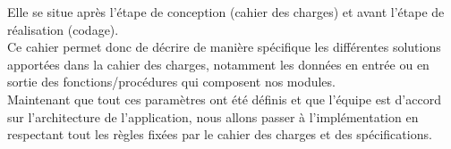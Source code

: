 \documentclass[a4]{article}
\begin{document}
	Elle se situe après l'étape de conception (cahier des charges) et avant l'étape de réalisation (codage).\\
	
	Ce cahier permet donc de décrire de manière spécifique les différentes solutions apportées dans la cahier des charges, notamment les données en entrée
	ou en sortie des fonctions/procédures qui composent nos modules.\\
	
	
	
	Maintenant que tout ces paramètres ont été définis et que l'équipe est d'accord sur l'architecture de l'application, nous allons
	passer à l'implémentation en respectant tout les règles fixées par le cahier des charges et des spécifications.
	
	
\end{document}
